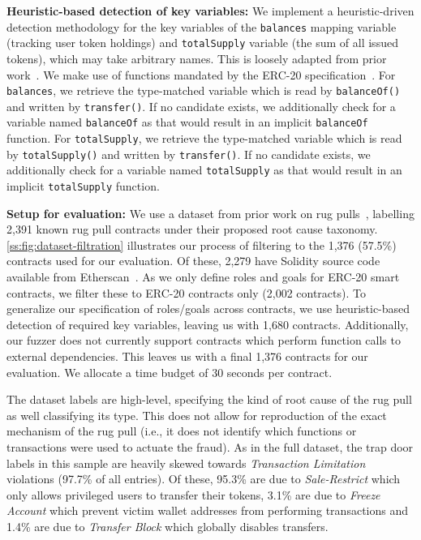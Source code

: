 \smallskip
\noindent
\noindent \textbf{Heuristic-based detection of key variables:}
    We implement a heuristic-driven detection methodology for the key variables of the \texttt{balances} mapping variable (tracking user token holdings) and \texttt{totalSupply} variable (the sum of all issued tokens), which may take arbitrary names.
    This is loosely adapted from prior work~\cite{fairchecker}.
    We make use of functions mandated by the ERC-20 specification~\cite{ERC20TokenStandard}.
    For \texttt{balances}, we retrieve the type-matched variable which is read by \texttt{balanceOf()} and written by \texttt{transfer()}.
    If no candidate exists, we additionally check for a variable named \texttt{balanceOf} as that would result in an implicit \texttt{balanceOf} function.
    For \texttt{totalSupply}, we retrieve the type-matched variable which is read by \texttt{totalSupply()} and written by \texttt{transfer()}.
    If no candidate exists, we additionally check for a variable named \texttt{totalSupply} as that would result in an implicit \texttt{totalSupply} function.



\smallskip
\noindent
\textbf{Setup for evaluation:}
We use a dataset from prior work on rug pulls~\cite{SoKRugPull2025}, labelling 2,391 known rug pull contracts under their proposed root cause taxonomy.
\autoref{ss:fig:dataset-filtration} illustrates our process of filtering to the 1,376 (57.5\%) contracts used for our evaluation.
Of these, 2,279 have Solidity source code available from Etherscan~\cite{etherscan}.
As we only define roles and goals for ERC-20 smart contracts, we filter these to ERC-20 contracts only (2,002 contracts).
To generalize our specification of roles/goals across contracts, we use heuristic-based detection of required key variables, leaving us with 1,680 contracts.
Additionally, our fuzzer does not currently support contracts which perform function calls to external dependencies.
This leaves us with a final 1,376 contracts for our evaluation.
We allocate a time budget of 30 seconds per contract.



The dataset labels are high-level, specifying the kind of root cause of the rug pull as well classifying its type.
This does not allow for reproduction of the exact mechanism of the rug pull (i.e., it does not identify which functions or transactions were used to actuate the fraud).
As in the full dataset, the trap door labels in this sample are heavily skewed towards \textit{Transaction Limitation} violations (97.7\% of all entries).
Of these, 95.3\% are due to \textit{Sale-Restrict} which only allows privileged users to transfer their tokens, 3.1\% are due to \textit{Freeze Account} which prevent victim wallet addresses from performing transactions and
1.4\% are due to \textit{Transfer Block} which globally disables transfers.

